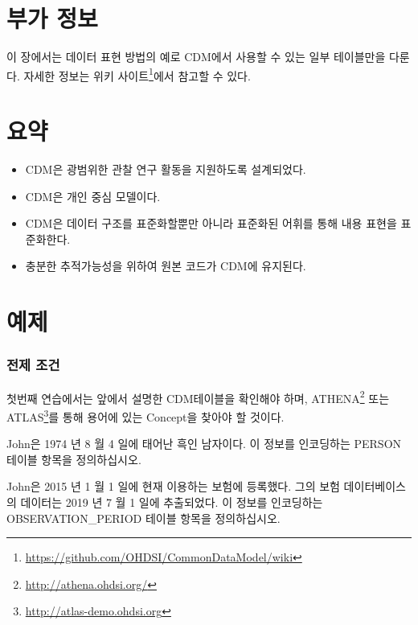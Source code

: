 \documentclass[11pt]{book}
\let\rmarkdownfootnote\footnote%
\def\footnote{\protect\rmarkdownfootnote}
\theoremstyle{definition}
\theoremstyle{definition}
\theoremstyle{definition}
\theoremstyle{remark}
\let\BeginKnitrBlock\begin \let\EndKnitrBlock\end
\begin{document}
\section{부가 정보}\label{-}

이 장에서는 데이터 표현 방법의 예로 CDM에서 사용할 수 있는 일부
테이블만을 다룬다. 자세한 정보는 위키 사이트\footnote{\url{https://github.com/OHDSI/CommonDataModel/wiki}}에서
참고할 수 있다.

\section{요약}\label{-2}

\BeginKnitrBlock{rmdsummary}
\begin{itemize}
\item
  CDM은 광범위한 관찰 연구 활동을 지원하도록 설계되었다.
\item
  CDM은 개인 중심 모델이다.
\item
  CDM은 데이터 구조를 표준화할뿐만 아니라 표준화된 어휘를 통해 내용
  표현을 표준화한다.
\item
  충분한 추적가능성을 위하여 원본 코드가 CDM에 유지된다.
\end{itemize}
\EndKnitrBlock{rmdsummary}

\section{예제}

\subsubsection*{전제 조건}\label{-}

첫번째 연습에서는 앞에서 설명한 CDM테이블을 확인해야 하며,
ATHENA\footnote{\url{http://athena.ohdsi.org/}} 또는 ATLAS\footnote{\url{http://atlas-demo.ohdsi.org}}를
통해 용어에 있는 Concept을 찾아야 할 것이다.

\BeginKnitrBlock{exercise}
\protect\hypertarget{exr:exerciseJohnPerson}{}{\label{exr:exerciseJohnPerson}
}John은 1974 년 8 월 4 일에 태어난 흑인 남자이다. 이 정보를 인코딩하는
PERSON 테이블 항목을 정의하십시오.
\EndKnitrBlock{exercise}

\BeginKnitrBlock{exercise}
\protect\hypertarget{exr:exerciseJohnOp}{}{\label{exr:exerciseJohnOp}
}John은 2015 년 1 월 1 일에 현재 이용하는 보험에 등록했다. 그의 보험
데이터베이스의 데이터는 2019 년 7 월 1 일에 추출되었다. 이 정보를
인코딩하는 OBSERVATION\_PERIOD 테이블 항목을 정의하십시오.
\EndKnitrBlock{exercise}
\end{document}
